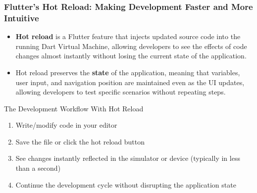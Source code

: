 \documentclass{beamer}
\begin{document}
	\begin{frame}
		\frametitle{Flutter's Hot Reload: Making Development Faster and More Intuitive}
		
		\begin{itemize}
			\item \textbf{Hot reload} is a Flutter feature that injects updated source code into the running Dart Virtual Machine, allowing developers to see the effects of code changes almost instantly without losing the current state of the application.
			\item Hot reload preserves the \textbf{state} of the application, meaning that variables, user input, and navigation position are maintained even as the UI updates, allowing developers to test specific scenarios without repeating steps.
		\end{itemize}
		
		\begin{block}{\scriptsize{The Development Workflow With Hot Reload}}
			\scriptsize{
				\begin{enumerate}
					\item Write/modify code in your editor
					\item Save the file or click the hot reload button
					\item See changes instantly reflected in the simulator or device (typically in less than a second)
					\item Continue the development cycle without disrupting the application state
				\end{enumerate}
			
			}
		\end{block}
		
	\end{frame}
	
\end{document}
